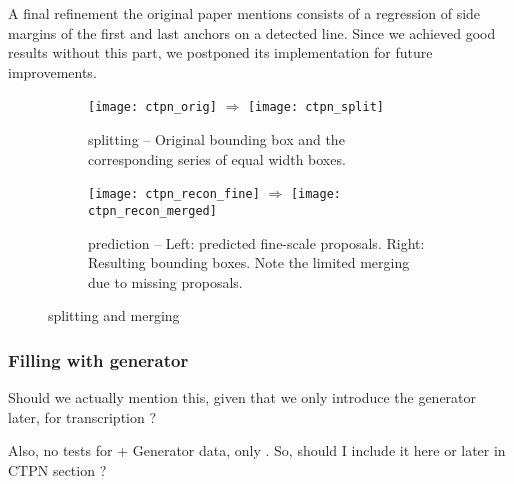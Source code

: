 		A final refinement the original paper mentions consists of a regression of side margins of the first and last anchors on a detected line. Since we achieved good results without this part, we postponed its implementation for future improvements.

		\begin{figure}
			\begin{subfigure}[b]{\linewidth}
				\texttt{[image: ctpn\_orig]}
				\(\Longrightarrow\)
				\texttt{[image: ctpn\_split]}
				\caption{\CTPN{} splitting -- Original bounding box and the corresponding series of equal width boxes.}\label{fig:ctpn_splitting}
			\end{subfigure}
			\par\bigskip
			\begin{subfigure}[b]{\linewidth}
				\texttt{[image: ctpn\_recon\_fine]}
				\(\Longrightarrow\)
				\texttt{[image: ctpn\_recon\_merged]}
				\caption{\CTPN{} prediction -- Left: predicted fine-scale proposals. Right: Resulting bounding boxes. Note the limited merging due to missing proposals.}\label{fig:ctpn_merging}
			\end{subfigure}
			\caption{\CTPN{} splitting and merging}
		\end{figure}





		\subsubsection{Filling with generator}
		\startToDo
			Should we actually mention this, given that we only introduce the generator later, for transcription ?

			Also, no tests for \FRCNN{} + Generator data, only \CTPN{}. So, should I include it here or later in CTPN section ?
		\stopToDo



